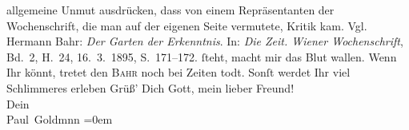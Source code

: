 \begin{ledgroupsized}[t]{13cm}
{{{                  allgemeine Unmut ausdrücken, dass von einem Repräsentanten der Wochenschrift, die man auf der eigenen
                  Seite vermutete, Kritik kam. Vgl. Hermann Bahr: \emph{Der Garten der Erkenntnis}. In: \emph{Die Zeit. Wiener Wochenschrift}, Bd. 2, H. 24, 16. 3. 1895, S. 171–172.}}}\label{K_L02734-10h} ſteht, macht
               mir das Blut wallen. Wenn Ihr könnt, tretet den \textsc{Bahr} noch bei Zeiten todt. Sonſt werdet Ihr viel Schlimmeres erleben{\dotsfour}\pend
           \pstart
           Grüß’ Dich Gott, mein lieber Freund!{\\[\baselineskip]}Dein {\\[\baselineskip]}\spacefill\mbox{Paul Goldmnn}\pend
           \leftskip=0em{}
         
         \endnumbering{}\end{ledgroupsized}  \newcommand{\dateiname}{L02734}\newcommand{\titel}{Paul Goldmann an Arthur Schnitzler, 24. 4. [1895]}\newcommand{\editorInnen}{Martin Anton Müller und Laura Untner}
      